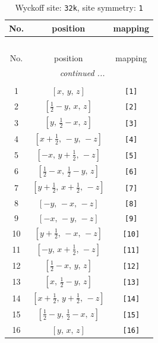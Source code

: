 \documentclass[fleqn,8pt]{jsarticle}
\begin{document}
\renewcommand{\arraystretch}{1.2}
\begin{longtable}{ccc}
\caption{Wyckoff site: {\tt 32k}, site symmetry: {\tt 1}}
 \\
 \hline \hline
No. & position & mapping \\ \hline \endfirsthead

\multicolumn{2}{l}{\tablename\ \thetable{}} \\
 \hline \hline
No. & position & mapping \\ \hline \endhead

 \hline \hline
\multicolumn{2}{r}{\footnotesize\it continued ...} \\ \endfoot

 \hline \hline
\multicolumn{2}{r}{} \\ \endlastfoot

1 & $\left[ x,\, y,\, z \right]$ & {\tt [1]} \\ \hline
2 & $\left[ \frac{1}{2} - y,\, x,\, z \right]$ & {\tt [2]} \\ \hline
3 & $\left[ y,\, \frac{1}{2} - x,\, z \right]$ & {\tt [3]} \\ \hline
4 & $\left[ x + \frac{1}{2},\, - y,\, - z \right]$ & {\tt [4]} \\ \hline
5 & $\left[ - x,\, y + \frac{1}{2},\, - z \right]$ & {\tt [5]} \\ \hline
6 & $\left[ \frac{1}{2} - x,\, \frac{1}{2} - y,\, z \right]$ & {\tt [6]} \\ \hline
7 & $\left[ y + \frac{1}{2},\, x + \frac{1}{2},\, - z \right]$ & {\tt [7]} \\ \hline
8 & $\left[ - y,\, - x,\, - z \right]$ & {\tt [8]} \\ \hline
9 & $\left[ - x,\, - y,\, - z \right]$ & {\tt [9]} \\ \hline
10 & $\left[ y + \frac{1}{2},\, - x,\, - z \right]$ & {\tt [10]} \\ \hline
11 & $\left[ - y,\, x + \frac{1}{2},\, - z \right]$ & {\tt [11]} \\ \hline
12 & $\left[ \frac{1}{2} - x,\, y,\, z \right]$ & {\tt [12]} \\ \hline
13 & $\left[ x,\, \frac{1}{2} - y,\, z \right]$ & {\tt [13]} \\ \hline
14 & $\left[ x + \frac{1}{2},\, y + \frac{1}{2},\, - z \right]$ & {\tt [14]} \\ \hline
15 & $\left[ \frac{1}{2} - y,\, \frac{1}{2} - x,\, z \right]$ & {\tt [15]} \\ \hline
16 & $\left[ y,\, x,\, z \right]$ & {\tt [16]} \\ \hline

\end{longtable}
\end{document}
